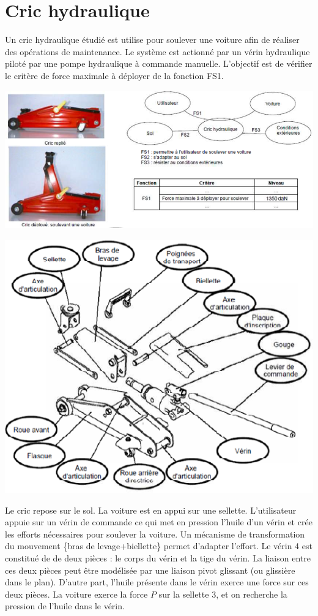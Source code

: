 \documentclass[10pt]{article}
\begin{document}
\newpage

\section*{Cric hydraulique}
\setcounter{subparagraph}{0}
Un cric hydraulique étudié est utilise pour soulever une voiture afin de réaliser des opérations de maintenance. Le système est actionné par un vérin hydraulique piloté par une pompe hydraulique à commande manuelle. L'objectif est de vérifier le critère de force maximale à déployer de la fonction FS1. 


\begin{center}
\includegraphics[width=.9\textwidth]{images/img7.png}
\end{center}


\begin{center}
\includegraphics[width=.9\textwidth]{images/img8.png}
\end{center}

Le cric repose sur le sol. La voiture est en appui sur une sellette. L'utilisateur appuie sur un vérin de commande ce qui met en pression l'huile d'un vérin et crée les efforts nécessaires pour soulever la voiture. Un mécanisme de transformation du mouvement \{bras de levage+biellette\} permet d'adapter l'effort. Le vérin 4 est constitué de de deux pièces : le corps du vérin et la tige du vérin. La liaison entre ces deux pièces peut être modélisée par une liaison pivot glissant (ou glissière dans le plan). D'autre part, l'huile présente dans le vérin exerce une force sur ces deux pièces. La voiture exerce la force $P$ sur la sellette 3, et on recherche la pression de l'huile dans le vérin. 
\end{document}
